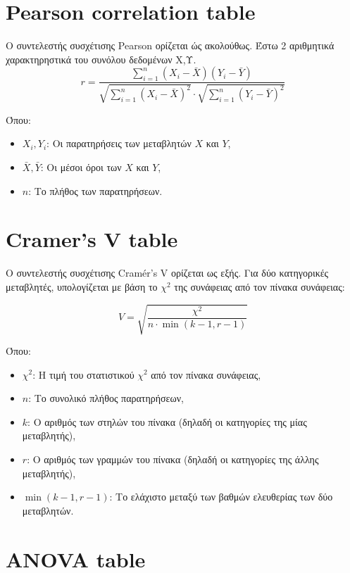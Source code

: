 \documentclass[12pt]{article}
\begin{document}
\section*{Pearson correlation table}

\noindent Ο συντελεστής συσχέτισης Pearson ορίζεται ώς ακολούθως. Έστω 2 αριθμητικά χαρακτηρηστικά του συνόλου δεδομένων Χ,Υ. \\

\[
r = \frac{\sum_{i=1}^{n} (X_i - \bar{X})(Y_i - \bar{Y})}
{\sqrt{\sum_{i=1}^{n} (X_i - \bar{X})^2} \cdot \sqrt{\sum_{i=1}^{n} (Y_i - \bar{Y})^2}}
\]

\noindent Όπου:
\begin{itemize}
    \item $X_i, Y_i$: Oι παρατηρήσεις των μεταβλητών $X$ και $Y$,
    \item $\bar{X}, \bar{Y}$: Oι μέσοι όροι των $X$ και $Y$,
    \item $n$: Tο πλήθος των παρατηρήσεων.
\end{itemize}

\section*{Cramer's V table}

\noindent Ο συντελεστής συσχέτισης Cramér's V ορίζεται ως εξής. Για δύο κατηγορικές μεταβλητές, υπολογίζεται με βάση το \(\chi^2\) της συνάφειας από τον πίνακα συνάφειας:

\[
V = \sqrt{ \frac{\chi^2}{n \cdot \min(k - 1, r - 1)} }
\]

\noindent Όπου:
\begin{itemize}
    \item \(\chi^2\): Η τιμή του στατιστικού \(\chi^2\) από τον πίνακα συνάφειας,
    \item \(n\): Το συνολικό πλήθος παρατηρήσεων,
    \item \(k\): Ο αριθμός των στηλών του πίνακα (δηλαδή οι κατηγορίες της μίας μεταβλητής),
    \item \(r\): Ο αριθμός των γραμμών του πίνακα (δηλαδή οι κατηγορίες της άλλης μεταβλητής),
    \item \(\min(k - 1, r - 1)\): Το ελάχιστο μεταξύ των βαθμών ελευθερίας των δύο μεταβλητών.
\end{itemize}

\section*{ANOVA table}
\end{document}
